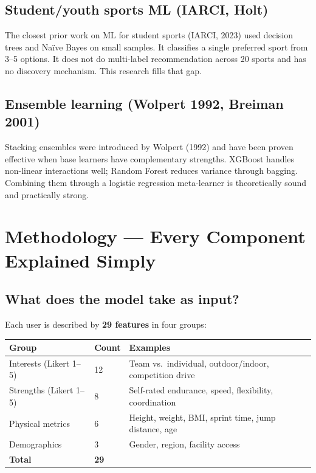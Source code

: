 \documentclass[12pt,a4paper]{article}
\begin{document}
\subsection{Student/youth sports ML (IARCI, Holt)}

The closest prior work on ML for student sports (IARCI, 2023) used decision
trees and Na\"{i}ve Bayes on small samples. It classifies a single preferred
sport from 3--5 options. It does not do multi-label recommendation across 20
sports and has no discovery mechanism. This research fills that gap.

\subsection{Ensemble learning (Wolpert 1992, Breiman 2001)}

Stacking ensembles were introduced by Wolpert (1992) and have been proven
effective when base learners have complementary strengths. XGBoost handles
non-linear interactions well; Random Forest reduces variance through bagging.
Combining them through a logistic regression meta-learner is theoretically
sound and practically strong.

\section{Methodology --- Every Component Explained Simply}

\subsection{What does the model take as input?}

Each user is described by \textbf{29 features} in four groups:

\begin{center}
\begin{tabular}{llp{7cm}}
\toprule
\textbf{Group} & \textbf{Count} & \textbf{Examples} \\
\midrule
Interests (Likert 1--5) & 12 & Team vs.\ individual, outdoor/indoor, competition drive \\
Strengths (Likert 1--5) & 8 & Self-rated endurance, speed, flexibility, coordination \\
Physical metrics & 6 & Height, weight, BMI, sprint time, jump distance, age \\
Demographics & 3 & Gender, region, facility access \\
\midrule
\textbf{Total} & \textbf{29} & \\
\bottomrule
\end{tabular}
\end{center}
\end{document}
